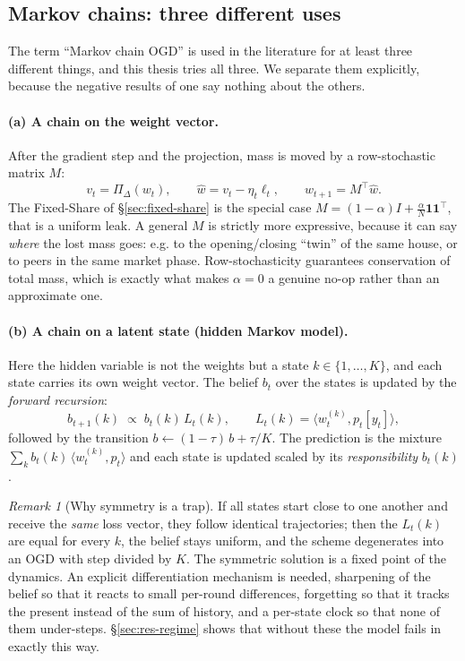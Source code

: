 \documentclass[12pt,a4paper,oneside]{report}
\renewcommand{\_}{\oldunderscore\allowbreak}
\theoremstyle{definition}
\theoremstyle{plain}
\theoremstyle{remark}
\newtheorem{remark}[theorem]{Remark}
\begin{document}
\subsection{Markov chains: three different uses}
\label{sec:markov-theory}

The term ``Markov chain OGD'' is used in the literature for at least three different things, and
this thesis tries all three. We separate them explicitly, because the negative results of one
say nothing about the others.

\paragraph{(a) A chain on the weight vector.} After the gradient step and the projection, mass is
moved by a row-stochastic matrix $M$:
\[
v_t = \Pi_{\Delta}(w_t), \qquad \hat{w} = v_t - \eta_t \ell_t, \qquad w_{t+1} = M^{\!\top}\hat{w}.
\]
The Fixed-Share of \S\ref{sec:fixed-share} is the special case
$M = (1-\alpha)I + \tfrac{\alpha}{N}\mathbf{1}\mathbf{1}^{\!\top}$, that is a uniform leak. A
general $M$ is strictly more expressive, because it can say \emph{where} the lost mass goes:
e.g. to the opening/closing ``twin'' of the same house, or to peers in the same market phase.
Row-stochasticity guarantees conservation of total mass, which is exactly what makes $\alpha=0$
a genuine no-op rather than an approximate one.

\paragraph{(b) A chain on a latent state (hidden Markov model).} Here the hidden variable is not
the weights but a state $k\in\{1,\dots,K\}$, and each state carries its own weight vector. The
belief $b_t$ over the states is updated by the \emph{forward recursion}:
\[
b_{t+1}(k) \;\propto\; b_t(k)\, L_t(k), \qquad L_t(k) = \langle w^{(k)}_t, p_t[y_t]\rangle,
\]
followed by the transition $b \leftarrow (1-\tau)\,b + \tau/K$. The prediction is the mixture
$\sum_k b_t(k)\,\langle w^{(k)}_t, p_t\rangle$ and each state is updated scaled by its
\emph{responsibility} $b_t(k)$.

\begin{remark}[Why symmetry is a trap]
\label{rem:symmetry}
If all states start close to one another and receive the \emph{same} loss vector, they follow
identical trajectories; then the $L_t(k)$ are equal for every $k$, the belief stays uniform, and
the scheme degenerates into an OGD with step divided by $K$. The symmetric solution is a fixed
point of the dynamics. An explicit differentiation mechanism is needed, sharpening of the
belief so that it reacts to small per-round differences, forgetting so that it tracks the
present instead of the sum of history, and a per-state clock so that none of them under-steps.
\S\ref{sec:res-regime} shows that without these the model fails in exactly this way.
\end{remark}
\end{document}
